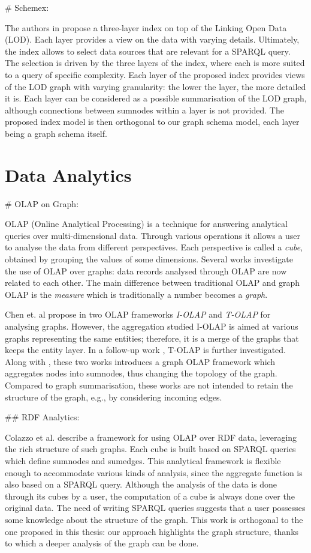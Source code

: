 \# Schemex:

The authors in \cite{konrath:jws:2012} propose a three-layer index on top of the Linking Open Data (LOD). Each layer provides a view on the data with varying details. Ultimately, the index allows to select data sources that are relevant for a SPARQL query. The selection is driven by the three layers of the index, where each is more suited to a query of specific complexity.
Each layer of the proposed index provides views of the LOD graph with varying granularity: the lower the layer, the more detailed it is. Each layer can be considered as a possible summarisation of the LOD graph, although connections between sumnodes within a layer is not provided. The proposed index model is then orthogonal to our graph schema model, each layer being a graph schema itself.

\section{Data Analytics}

\# OLAP on Graph:

OLAP (Online Analytical Processing) is a technique for answering analytical queries over multi-dimensional data. Through various operations it allows a user to analyse the data from different perspectives. Each perspective is called a \emph{cube}, obtained by grouping the values of some dimensions. Several works investigate the use of OLAP over graphs: data records analysed through OLAP are now related to each other. The main difference between traditional OLAP and graph OLAP is the \emph{measure} which is traditionally a number becomes a \emph{graph}.

Chen et. al propose in \cite{chen:icdm:2008} two OLAP frameworks \emph{I-OLAP} and \emph{T-OLAP} for analysing graphs. However, the aggregation studied I-OLAP is aimed at various graphs representing the same entities; therefore, it is a merge of the graphs that keeps the entity layer. In a follow-up work \cite{qu:dasfaa:2011}, T-OLAP is further investigated. Along with \cite{zhao:sigmod:2011}, these two works introduces a graph OLAP framework which aggregates nodes into sumnodes, thus changing the topology of the graph. Compared to graph summarisation, these works are not intended to retain the structure of the graph, e.g., by considering incoming edges.

\#\# RDF Analytics:

Colazzo et al. \cite{colazzo:www:2014} describe a framework for using OLAP over RDF data, leveraging the rich structure of such graphs. Each cube is built based on SPARQL queries which define sumnodes and sumedges. This analytical framework is flexible enough to accommodate various kinds of analysis, since the aggregate function is also based on a SPARQL query. Although the analysis of the data is done through its cubes by a user, the computation of a cube is always done over the original data. The need of writing SPARQL queries suggests that a user possesses some knowledge about the structure of the graph. This work is orthogonal to the one proposed in this thesis: our approach highlights the graph structure, thanks to which a deeper analysis of the graph can be done.

